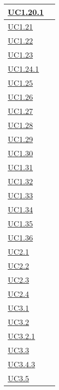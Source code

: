 \begin{longtable}{|P{6cm}|P{6cm}|}
	\hline \hyperref[UC1.20.1]{UC1.20.1} &  \\
	\hline \hyperref[UC1.21]{UC1.21} &  \\
	\hline \hyperref[UC1.22]{UC1.22} &  \\
	\hline \hyperref[UC1.23]{UC1.23} &  \\
	\hline \hyperref[UC1.24.1]{UC1.24.1} &  \\
	\hline \hyperref[UC1.25]{UC1.25} &  \\
	\hline \hyperref[UC1.26]{UC1.26} &  \\
	\hline \hyperref[UC1.27]{UC1.27} &  \\
	\hline \hyperref[UC1.28]{UC1.28} &  \\
	\hline \hyperref[UC1.29]{UC1.29} &  \\
	\hline \hyperref[UC1.30]{UC1.30} &  \\
	\hline \hyperref[UC1.31]{UC1.31} &  \\
	\hline \hyperref[UC1.32]{UC1.32} &  \\
	\hline \hyperref[UC1.33]{UC1.33} &  \\
	\hline \hyperref[UC1.34]{UC1.34} &  \\
	\hline \hyperref[UC1.35]{UC1.35} &  \\
	\hline \hyperref[UC1.36]{UC1.36} &  \\	
	\hline \hyperref[UC2.1]{UC2.1} &  \\
	\hline \hyperref[UC2.2]{UC2.2} &  \\
	\hline \hyperref[UC2.3]{UC2.3} &  \\
	\hline \hyperref[UC2.4]{UC2.4} &  \\	
	\hline \hyperref[UC3.1]{UC3.1} &  \\
	\hline \hyperref[UC3.2]{UC3.2} &  \\
	\hline \hyperref[UC3.2.1]{UC3.2.1} &  \\
	\hline \hyperref[UC3.3]{UC3.3} &  \\
	\hline \hyperref[UC3.4.3]{UC3.4.3} &  \\
	\hline \hyperref[UC3.5]{UC3.5} &  \\

\end{longtable}
